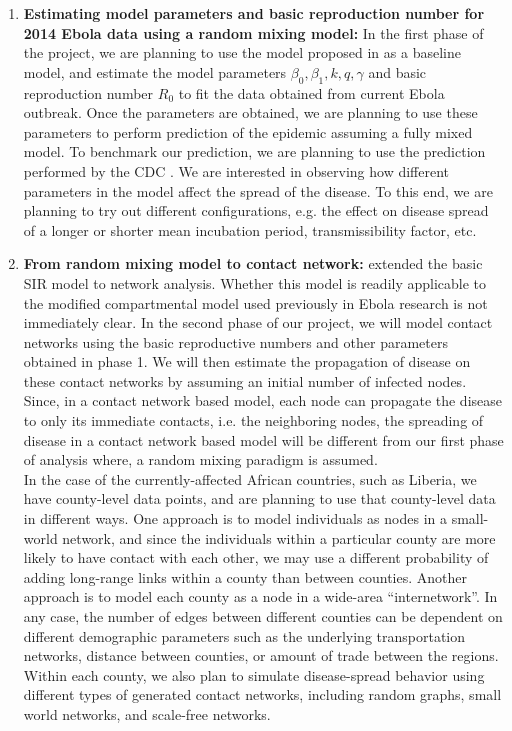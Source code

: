 \documentclass[10pt, journal,onecolumn]{IEEEtran}
\begin{document}
\bigskip

\begin{enumerate}

\item \textbf{Estimating model parameters and basic reproduction number for 2014 Ebola data using a random mixing model:}
  In the first phase of the project, we are planning to use the model proposed in
  \citep{chowell2004basic} as a baseline model, and estimate the model parameters $\beta_0, \beta_1,
  k, q, \gamma$  and basic reproduction number $R_0$ to fit the data obtained from current Ebola
  outbreak. Once the parameters are obtained, we are planning to use these parameters to perform
  prediction of the epidemic assuming a fully mixed model. To benchmark our prediction, we are
  planning to use the prediction performed by the CDC \citep{meltzer2014estimating}. We are
  interested in observing how different parameters in the model affect the spread of the disease. To
  this end, we are planning to try out different configurations, e.g. the effect on disease spread
  of a longer or shorter mean incubation period, transmissibility factor, etc. \\

\item \textbf{From random mixing model to contact network:} \citep{newman2002spread,
  meyers2005network} extended the basic SIR model to network analysis. Whether this model is readily
  applicable to the modified compartmental model used previously in Ebola research
  \citep{chowell2004basic, legrand2007understanding} is not immediately clear. In the second phase of
  our project, we will model contact networks using the basic reproductive numbers and other
  parameters obtained in phase 1. We will then estimate the propagation of disease on these
  contact networks by assuming an initial number of infected nodes. Since, in a contact network based
  model, each node can propagate the disease to only its immediate contacts, i.e. the neighboring
  nodes, the spreading of disease in a contact network based model will be different from our first
  phase of analysis where, a random mixing paradigm is assumed. \\

  In the case of the currently-affected African countries, such as Liberia,
  we have county-level data points, and are planning to use that county-level data in different ways.
  One approach is to model individuals as nodes in a small-world network, and
  since the individuals within a particular county are more likely to have contact with each other,
  we may use a different probability of adding long-range links within a county than between counties.
  Another approach is to model each county as a node in a wide-area ``internetwork''.
  In any case, the number of edges between different counties can be dependent on different
  demographic parameters such as the underlying transportation networks, distance between counties,
  or amount of trade between the regions.
  Within each county, we also plan to simulate disease-spread behavior using different types of
  generated contact networks, including random graphs, small world networks, and scale-free
  networks. \\


\end{enumerate}
\end{document}
